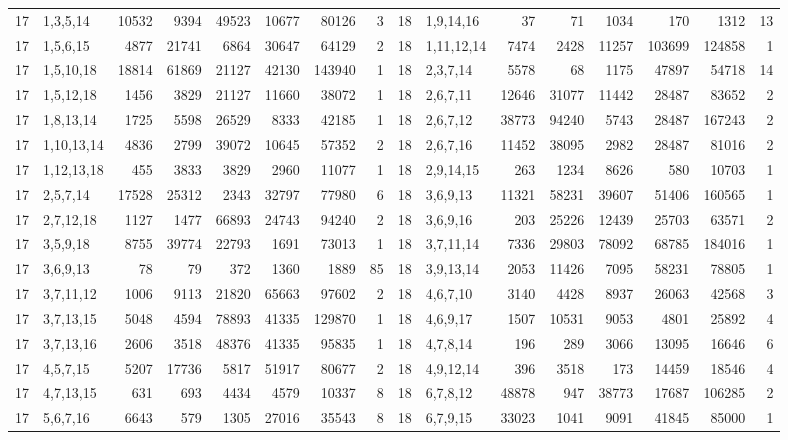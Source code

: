 \begin{table}[tp]
\begin{ruledtabular}
\begin{tabular}{rlrrrrrr@{\hspace{2.2em}}rlrrrrrr}
17 & 1,3,5,14 & 10532 & 9394 & 49523 & 10677 & 80126 & 3 & 18 & 1,9,14,16 & 37 & 71 & 1034 & 170 & 1312 & 13 \\
17 & 1,5,6,15 & 4877 & 21741 & 6864 & 30647 & 64129 & 2 & 18 & 1,11,12,14 & 7474 & 2428 & 11257 & 103699 & 124858 & 1 \\
17 & 1,5,10,18 & 18814 & 61869 & 21127 & 42130 & 143940 & 1 & 18 & 2,3,7,14 & 5578 & 68 & 1175 & 47897 & 54718 & 14 \\
17 & 1,5,12,18 & 1456 & 3829 & 21127 & 11660 & 38072 & 1 & 18 & 2,6,7,11 & 12646 & 31077 & 11442 & 28487 & 83652 & 2 \\
17 & 1,8,13,14 & 1725 & 5598 & 26529 & 8333 & 42185 & 1 & 18 & 2,6,7,12 & 38773 & 94240 & 5743 & 28487 & 167243 & 2 \\
17 & 1,10,13,14 & 4836 & 2799 & 39072 & 10645 & 57352 & 2 & 18 & 2,6,7,16 & 11452 & 38095 & 2982 & 28487 & 81016 & 2 \\
17 & 1,12,13,18 & 455 & 3833 & 3829 & 2960 & 11077 & 1 & 18 & 2,9,14,15 & 263 & 1234 & 8626 & 580 & 10703 & 1 \\
17 & 2,5,7,14 & 17528 & 25312 & 2343 & 32797 & 77980 & 6 & 18 & 3,6,9,13 & 11321 & 58231 & 39607 & 51406 & 160565 & 1 \\
17 & 2,7,12,18 & 1127 & 1477 & 66893 & 24743 & 94240 & 2 & 18 & 3,6,9,16 & 203 & 25226 & 12439 & 25703 & 63571 & 2 \\
17 & 3,5,9,18 & 8755 & 39774 & 22793 & 1691 & 73013 & 1 & 18 & 3,7,11,14 & 7336 & 29803 & 78092 & 68785 & 184016 & 1 \\
17 & 3,6,9,13 & 78 & 79 & 372 & 1360 & 1889 & 85 & 18 & 3,9,13,14 & 2053 & 11426 & 7095 & 58231 & 78805 & 1 \\
17 & 3,7,11,12 & 1006 & 9113 & 21820 & 65663 & 97602 & 2 & 18 & 4,6,7,10 & 3140 & 4428 & 8937 & 26063 & 42568 & 3 \\
17 & 3,7,13,15 & 5048 & 4594 & 78893 & 41335 & 129870 & 1 & 18 & 4,6,9,17 & 1507 & 10531 & 9053 & 4801 & 25892 & 4 \\
17 & 3,7,13,16 & 2606 & 3518 & 48376 & 41335 & 95835 & 1 & 18 & 4,7,8,14 & 196 & 289 & 3066 & 13095 & 16646 & 6 \\
17 & 4,5,7,15 & 5207 & 17736 & 5817 & 51917 & 80677 & 2 & 18 & 4,9,12,14 & 396 & 3518 & 173 & 14459 & 18546 & 4 \\
17 & 4,7,13,15 & 631 & 693 & 4434 & 4579 & 10337 & 8 & 18 & 6,7,8,12 & 48878 & 947 & 38773 & 17687 & 106285 & 2 \\
17 & 5,6,7,16 & 6643 & 579 & 1305 & 27016 & 35543 & 8 & 18 & 6,7,9,15 & 33023 & 1041 & 9091 & 41845 & 85000 & 1 \\

\end{tabular}
\end{ruledtabular}
\end{table}
